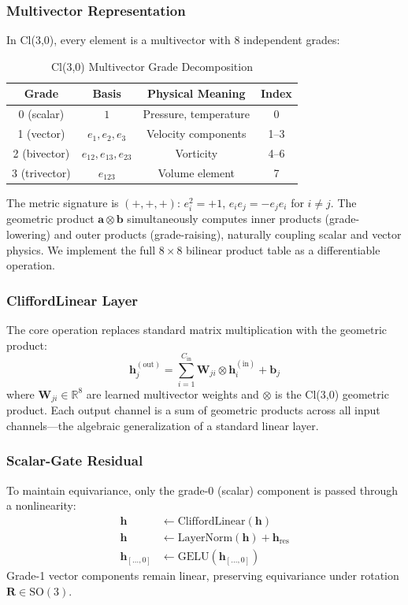 \documentclass[conference]{IEEEtran}
\begin{document}
\subsubsection{Multivector Representation}
In Cl(3,0), every element is a multivector with 8 independent grades:

\begin{table}[htbp]
\caption{Cl(3,0) Multivector Grade Decomposition}
\label{tab:grades}
\centering
\begin{tabular}{cccc}
\toprule
\textbf{Grade} & \textbf{Basis} & \textbf{Physical Meaning} & \textbf{Index} \\
\midrule
0 (scalar) & $1$ & Pressure, temperature & 0 \\
1 (vector) & $e_1, e_2, e_3$ & Velocity components & 1--3 \\
2 (bivector) & $e_{12}, e_{13}, e_{23}$ & Vorticity & 4--6 \\
3 (trivector) & $e_{123}$ & Volume element & 7 \\
\bottomrule
\end{tabular}
\end{table}

The metric signature is $(+,+,+)$: $e_i^2 = +1$, $e_i e_j = -e_j e_i$ for $i \neq j$. The geometric product $\bm{a} \otimes \bm{b}$ simultaneously computes inner products (grade-lowering) and outer products (grade-raising), naturally coupling scalar and vector physics. We implement the full $8 \times 8$ bilinear product table as a differentiable operation.

\subsubsection{CliffordLinear Layer}
The core operation replaces standard matrix multiplication with the geometric product:
\begin{equation}
\bm{h}_j^{(\text{out})} = \sum_{i=1}^{C_\text{in}} \bm{W}_{ji} \otimes \bm{h}_i^{(\text{in})} + \bm{b}_j
\label{eq:clifford_linear}
\end{equation}
where $\bm{W}_{ji} \in \mathbb{R}^8$ are learned multivector weights and $\otimes$ is the Cl(3,0) geometric product. Each output channel is a sum of geometric products across all input channels---the algebraic generalization of a standard linear layer.

\subsubsection{Scalar-Gate Residual}
To maintain equivariance, only the grade-0 (scalar) component is passed through a nonlinearity:
\begin{align}
\bm{h} &\leftarrow \text{CliffordLinear}(\bm{h}) \\
\bm{h} &\leftarrow \text{LayerNorm}(\bm{h}) + \bm{h}_\text{res} \\
\bm{h}_{[\ldots, 0]} &\leftarrow \text{GELU}(\bm{h}_{[\ldots, 0]}) \label{eq:scalar_gate}
\end{align}
Grade-1 vector components remain linear, preserving equivariance under rotation $\bm{R} \in \text{SO}(3)$.
\end{document}
